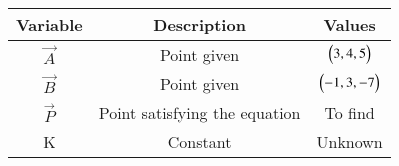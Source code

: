 \begin{tabular}[12pt]{ |c| c| c|}
    \hline
    \textbf{Variable} & \textbf{Description} & \textbf{Values} \\ 
    \hline
    $\vec{A}$ & Point given & $\begin{pmatrix}3,4,5\end{pmatrix}$ \\
    \hline
    $\vec{B}$ & Point given & $\begin{pmatrix}-1,3,-7\end{pmatrix}$ \\
    \hline
    $\vec{P}$ & Point satisfying the equation & To find\\
    \hline 
    K & Constant & Unknown \\
    \hline   
    \end{tabular}
